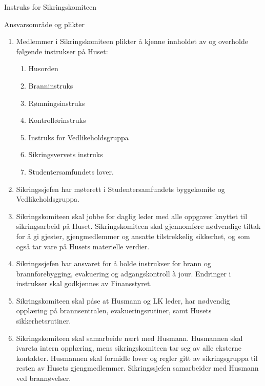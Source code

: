 \begin{instruks}{Instruks for Sikringskomiteen}{}{}
    \begin{instruksledd}{Ansvarsområde og plikter}
        \begin{enumerate}
            \item Medlemmer i Sikringskomiteen plikter å kjenne innholdet av og overholde
                følgende instrukser på Huset:
                \begin{enumerate}
                    \item  Husorden
                    \item Branninstruks
                    \item Rømningsinstruks
                    \item Kontrollørinstruks
                    \item Instruks for Vedlikeholdsgruppa
                    \item Sikringsvervets instruks
                    \item Studentersamfundets lover.
                \end{enumerate}
            \item Sikringssjefen har møterett i Studentersamfundets byggekomite og
                Vedlikeholdsgruppa.
            \item Sikringskomiteen skal jobbe for daglig leder med alle oppgaver knyttet
                til sikringsarbeid på Huset.
                Sikringskomiteen skal gjennomføre nødvendige tiltak for å gi gjester,
                gjengmedlemmer og ansatte
                tilstrekkelig sikkerhet, og som også tar vare på Husets materielle
                verdier.
            \item Sikringssjefen har ansvaret for å holde instrukser for brann og
                brannforebygging, evakuering og
                adgangskontroll à jour. Endringer i instrukser skal godkjennes av
                Finansstyret.
            \item Sikringskomiteen skal påse at Husmann og LK leder, har nødvendig
                opplæring på brannsentralen,
                evakueringsrutiner, samt Husets sikkerhetsrutiner.
            \item Sikringskomiteen skal samarbeide nært med Husmann. Husmannen skal ivareta
                intern opplæring, mens
                sikringskomiteen tar seg av alle eksterne kontakter. Husmannen skal
                formidle lover og regler gitt av
                sikringsgruppa til resten av Husets gjengmedlemmer. Sikringssjefen
                samarbeider med Husmann ved brannøvelser.

\end{enumerate}
\end{instruksledd}
\end{instruks}
